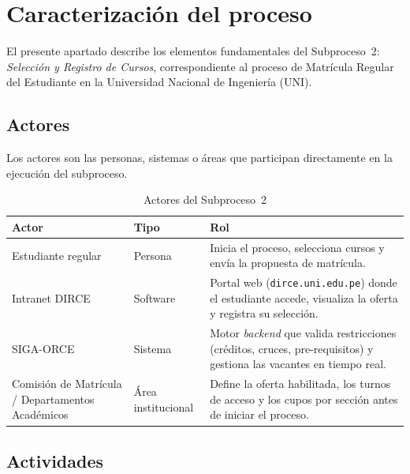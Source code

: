 

\section{Caracterización del proceso}

El presente apartado describe los elementos fundamentales del Subproceso~2:
\textit{Selección y Registro de Cursos}, correspondiente al proceso de Matrícula
Regular del Estudiante en la Universidad Nacional de Ingeniería (UNI).

\subsection{Actores}

Los actores son las personas, sistemas o áreas que participan directamente
en la ejecución del subproceso.

\begin{table}[H]
\centering
\caption{Actores del Subproceso~2}
\label{tab:actores_sp2}
\renewcommand{\arraystretch}{1.3}
\begin{tabular}{|p{3.8cm}|p{2.5cm}|p{7.5cm}|}
\hline
\textbf{Actor} & \textbf{Tipo} & \textbf{Rol} \\
\hline
Estudiante regular & Persona &
  Inicia el proceso, selecciona cursos y envía la propuesta de matrícula. \\
\hline
Intranet DIRCE & Software &
  Portal web (\texttt{dirce.uni.edu.pe}) donde el estudiante accede,
  visualiza la oferta y registra su selección. \\
\hline
SIGA-ORCE & Sistema &
  Motor \textit{backend} que valida restricciones (créditos, cruces,
  pre-requisitos) y gestiona las vacantes en tiempo real. \\
\hline
Comisión de Matrícula / Departamentos Académicos & Área institucional &
  Define la oferta habilitada, los turnos de acceso y los cupos
  por sección antes de iniciar el proceso. \\
\hline
\end{tabular}
\end{table}

\subsection{Actividades}

